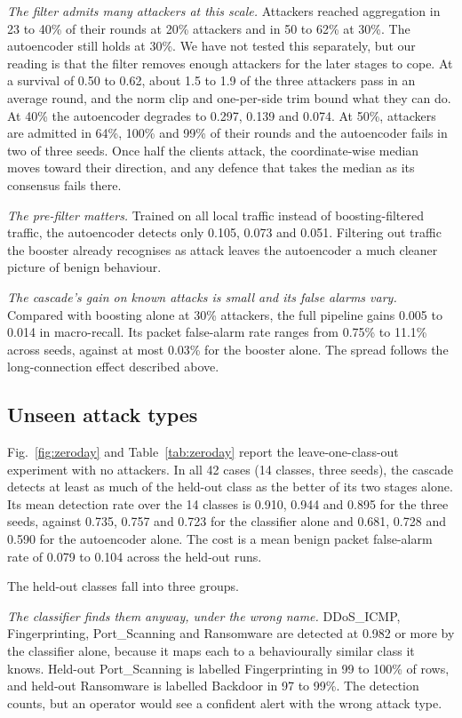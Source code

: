 \textit{The filter admits many attackers at this scale.} Attackers reached aggregation in 23 to 40\% of their rounds at 20\% attackers and in 50 to 62\% at 30\%. The autoencoder still holds at 30\%. We have not tested this separately, but our reading is that the filter removes enough attackers for the later stages to cope. At a survival of 0.50 to 0.62, about 1.5 to 1.9 of the three attackers pass in an average round, and the norm clip and one-per-side trim bound what they can do. At 40\% the autoencoder degrades to 0.297, 0.139 and 0.074. At 50\%, attackers are admitted in 64\%, 100\% and 99\% of their rounds and the autoencoder fails in two of three seeds. Once half the clients attack, the coordinate-wise median moves toward their direction, and any defence that takes the median as its consensus fails there.

\textit{The pre-filter matters.} Trained on all local traffic instead of boosting-filtered traffic, the autoencoder detects only 0.105, 0.073 and 0.051. Filtering out traffic the booster already recognises as attack leaves the autoencoder a much cleaner picture of benign behaviour.

\textit{The cascade's gain on known attacks is small and its false alarms vary.} Compared with boosting alone at 30\% attackers, the full pipeline gains 0.005 to 0.014 in macro-recall. Its packet false-alarm rate ranges from 0.75\% to 11.1\% across seeds, against at most 0.03\% for the booster alone. The spread follows the long-connection effect described above.

\subsection{Unseen attack types}
\label{sec:zeroday}
Fig.~\ref{fig:zeroday} and Table~\ref{tab:zeroday} report the leave-one-class-out experiment with no attackers. In all 42 cases (14 classes, three seeds), the cascade detects at least as much of the held-out class as the better of its two stages alone. Its mean detection rate over the 14 classes is 0.910, 0.944 and 0.895 for the three seeds, against 0.735, 0.757 and 0.723 for the classifier alone and 0.681, 0.728 and 0.590 for the autoencoder alone. The cost is a mean benign packet false-alarm rate of 0.079 to 0.104 across the held-out runs.

The held-out classes fall into three groups.

\textit{The classifier finds them anyway, under the wrong name.} DDoS\_ICMP, Fingerprinting, Port\_Scanning and Ransomware are detected at 0.982 or more by the classifier alone, because it maps each to a behaviourally similar class it knows. Held-out Port\_Scanning is labelled Fingerprinting in 99 to 100\% of rows, and held-out Ransomware is labelled Backdoor in 97 to 99\%. The detection counts, but an operator would see a confident alert with the wrong attack type.

